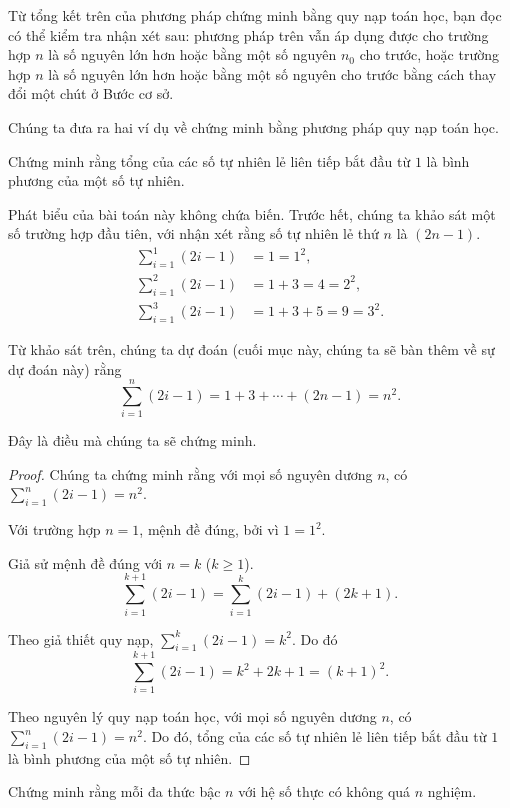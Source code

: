 Từ tổng kết trên của phương pháp chứng minh bằng quy nạp toán học, bạn đọc có thể kiểm tra nhận xét sau: phương pháp trên vẫn áp dụng được cho trường hợp $n$ là số nguyên lớn hơn hoặc bằng một số nguyên $n_{0}$ cho trước, hoặc trường hợp $n$ là số nguyên lớn hơn hoặc bằng một số nguyên cho trước bằng cách thay đổi một chút ở Bước cơ sở.

Chúng ta đưa ra hai ví dụ về chứng minh bằng phương pháp quy nạp toán học.

\begin{example}
    Chứng minh rằng tổng của các số tự nhiên lẻ liên tiếp bắt đầu từ $1$ là bình phương của một số tự nhiên.
\end{example}

Phát biểu của bài toán này không chứa biến. Trước hết, chúng ta khảo sát một số trường hợp đầu tiên, với nhận xét rằng số tự nhiên lẻ thứ $n$ là $(2n - 1)$.
\begin{align*}
    \sum^{1}_{i=1}(2i - 1) & = 1 = 1^{2},             \\
    \sum^{2}_{i=1}(2i - 1) & = 1 + 3 = 4 = 2^{2},     \\
    \sum^{3}_{i=1}(2i - 1) & = 1 + 3 + 5 = 9 = 3^{2}.
\end{align*}

Từ khảo sát trên, chúng ta dự đoán (cuối mục này, chúng ta sẽ bàn thêm về sự dự đoán này) rằng
\[
    \sum^{n}_{i=1}(2i - 1) = 1 + 3 + \cdots + (2n - 1) = n^{2}.
\]

Đây là điều mà chúng ta sẽ chứng minh.

\begin{proof}
    Chúng ta chứng minh rằng với mọi số nguyên dương $n$, có $\sum^{n}_{i=1}(2i - 1) = n^{2}$.

    Với trường hợp $n = 1$, mệnh đề đúng, bởi vì $1 = 1^{2}$.

    Giả sử mệnh đề đúng với $n = k$ ($k\geq 1$).
    \[
        \sum^{k+1}_{i=1}(2i - 1) = \sum^{k}_{i=1}(2i - 1) + (2k + 1).
    \]

    Theo giả thiết quy nạp, $\sum^{k}_{i=1}(2i - 1) = k^{2}$. Do đó
    \[
        \sum^{k+1}_{i=1}(2i - 1) = k^{2} + 2k + 1 = {(k+1)}^{2}.
    \]

    Theo nguyên lý quy nạp toán học, với mọi số nguyên dương $n$, có $\sum^{n}_{i=1}(2i - 1) = n^{2}$. Do đó, tổng của các số tự nhiên lẻ liên tiếp bắt đầu từ $1$ là bình phương của một số tự nhiên.
\end{proof}

\begin{example}
    Chứng minh rằng mỗi đa thức bậc $n$ với hệ số thực có không quá $n$ nghiệm.
\end{example}

